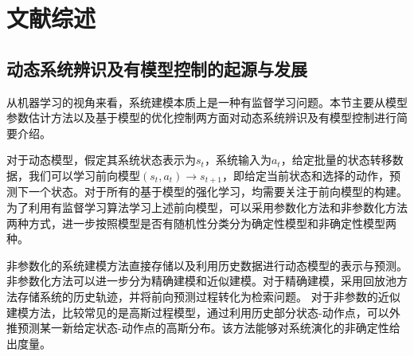 \chapter{文献综述}
    



\section{动态系统辨识及有模型控制的起源与发展}


从机器学习的视角来看，系统建模本质上是一种有监督学习问题\cite{jordan1992forward}。本节主要从模型参数估计方法以及基于模型的优化控制两方面对动态系统辨识及有模型控制进行简要介绍。

对于动态模型，假定其系统状态表示为$s_t$，系统输入为$a_t$，给定批量的状态转移数据，我们可以学习前向模型$\left(s_t, a_t\right) \rightarrow s_{t+1}$，即给定当前状态和选择的动作，预测下一个状态。对于所有的基于模型的强化学习，均需要关注于前向模型的构建。为了利用有监督学习算法学习上述前向模型，可以采用参数化方法和非参数化方法两种方式，进一步按照模型是否有随机性分类分为确定性模型和非确定性模型两种。

非参数化的系统建模方法直接存储以及利用历史数据进行动态模型的表示与预测。
非参数化方法可以进一步分为精确建模和近似建模。对于精确建模，采用回放池\cite{lin1992memory}方法存储系统的历史轨迹，并将前向预测过程转化为检索问题。
对于非参数的近似建模方法，比较常见的是高斯过程模型\cite{deisenroth2011pilco,deisenroth2011pilco}，通过利用历史部分状态-动作点，可以外推预测某一新给定状态-动作点的高斯分布。该方法能够对系统演化的非确定性给出度量。

